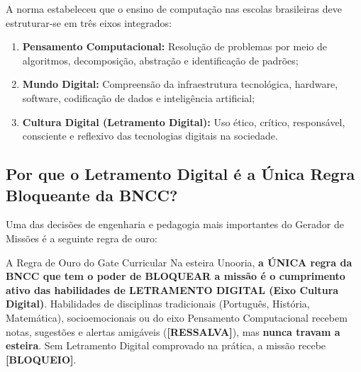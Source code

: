 \documentclass[11pt,a4paper]{article}
\newcommand{\cAmarelo}{\textcolor{UnooriaGold}{\textbf{[RESSALVA]}}}
\newcommand{\cVermelho}{\textcolor{UnooriaRed}{\textbf{[BLOQUEIO]}}}
\begin{document}
A norma estabeleceu que o ensino de computação nas escolas brasileiras deve estruturar-se em três eixos integrados:
\begin{enumerate}
  \item \textbf{Pensamento Computacional:} Resolução de problemas por meio de algoritmos, decomposição, abstração e identificação de padrões;
  \item \textbf{Mundo Digital:} Compreensão da infraestrutura tecnológica, hardware, software, codificação de dados e inteligência artificial;
  \item \textbf{Cultura Digital (Letramento Digital):} Uso ético, crítico, responsável, consciente e reflexivo das tecnologias digitais na sociedade.
\end{enumerate}

\subsection{Por que o Letramento Digital é a Única Regra Bloqueante da BNCC?}
Uma das decisões de engenharia e pedagogia mais importantes do Gerador de Missões é a seguinte regra de ouro:
\begin{caixaGuardrail}{A Regra de Ouro do Gate Curricular}
Na esteira Unooria, \textbf{a ÚNICA regra da BNCC que tem o poder de BLOQUEAR a missão é o cumprimento ativo das habilidades de LETRAMENTO DIGITAL (Eixo Cultura Digital)}.
Habilidades de disciplinas tradicionais (Português, História, Matemática), socioemocionais ou do eixo Pensamento Computacional recebem notas, sugestões e alertas amigáveis (\cAmarelo), mas \textbf{nunca travam a esteira}. Sem Letramento Digital comprovado na prática, a missão recebe \cVermelho.
\end{caixaGuardrail}
\end{document}
